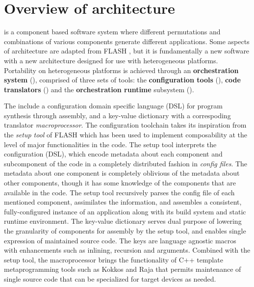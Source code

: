 \chapter{Overview of \flashx architecture}
\label{Chp:Architecture}

\flashx is a component based software system where different
permutations and combinations of various components generate different
applications. Some aspects of \flashx architecture are adapted 
from FLASH \cite{Dubey2009}, but it is fundamentally a new software with a new
architecture designed for use with heterogeneous
platforms. Portability on heterogeneous platforms is achieved through an
\textbf{orchestration system} (\ORS), comprised of three sets of tools: the
  \textbf{configuration tools} (\CFT), \textbf{code translators} (\CT)
  and the \textbf{orchestration runtime} subsystem (\OR).

  The {\CFT} include a configuration domain specific language (DSL) for program
synthesis through assembly, and a key-value dictionary with a correspoding translator {\it
  macroprocessor}. The configuration toolchain takes its inspiration from the {\it setup
  tool} of FLASH which has been used to implement
composability at the level of major functionalities in the code.  The
setup tool interprets the configuration (DSL), which encode metadata about each component
and  subcomponent of the code in a completely distributed fashion in
{\it config files}. The metadata about one component is completely
oblivious of the metadata about other components, though it has
some knowledge of the components that are available in the code. The
setup tool recursively parses the config file of each mentioned
component, assimilates the information, and assembles a consistent,
fully-configured instance of an application along with its build
system and static runtime environment. The key-value dictionary serves
dual purpose of lowering the granularity of components for assembly by
the setup tool, and enables single expression of maintained source
code. The keys are language agnostic macros with enhancements such as
inlining, recursion and arguments. Combined with the setup tool, the
macroprocessor brings the functionality of C++ template
metaprogramming tools such as Kokkos and Raja that permits 
maintenance of single source code that can be specialized for target
devices as needed.



